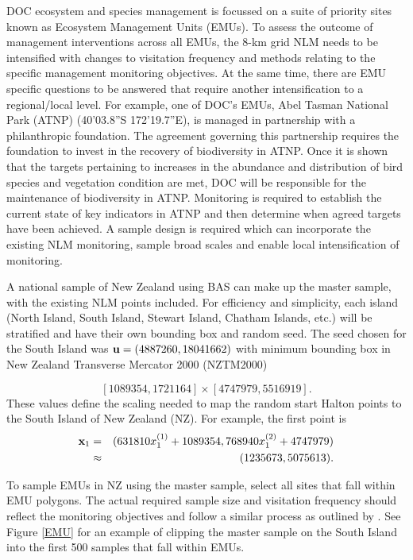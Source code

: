 \documentclass[titlepage]{article}
\begin{document}
DOC ecosystem and species management is focussed on a suite of priority sites known as Ecosystem Management Units (EMUs). To assess the outcome of management interventions across all EMUs, the 8-km grid NLM needs to be intensified with changes to visitation frequency and methods relating to the specific management monitoring objectives. At the same time, there are EMU specific questions to be answered that require another intensification to a regional/local level. For example, one of DOC's EMUs, Abel Tasman National Park (ATNP) (40'03.8''S 172'19.7''E), is managed in partnership with a philanthropic foundation. The agreement governing this partnership requires the foundation to invest in the recovery of biodiversity in ATNP. Once it is shown that the targets pertaining to increases in the abundance and distribution of bird species and vegetation condition are met, DOC will be responsible for the maintenance of biodiversity in ATNP. Monitoring is required to establish the current state of key indicators in ATNP and then determine when agreed targets have been achieved. A sample design is required which can incorporate the existing NLM monitoring, sample broad scales and enable local intensification of monitoring.

A national sample of New Zealand using BAS can make up the master sample, with the existing NLM points included. For efficiency and simplicity, each island (North Island, South Island, Stewart Island, Chatham Islands, etc.) will be stratified and have their own bounding box and random seed. The seed chosen for the South Island was ${\bf u} = (4887260, 18041662)$ with minimum bounding box in New Zealand Transverse Mercator 2000 (NZTM2000)

$$
[1089354, 1721164] \times [4747979, 5516919].
$$
These values define the scaling needed to map the random start Halton points to the South Island of New Zealand (NZ). For example, the first point is
\begin{eqnarray*}
	{\bf x}_1 & = & (631810 x_1^{(1)} + 1089354, 768940 x_1^{(2)} + 4747979)\\
	& \approx & (1235673, 5075613).
\end{eqnarray*}

To sample EMUs in NZ using the master sample, select all sites that fall within EMU polygons. The actual required sample size and visitation frequency should reflect the monitoring objectives and follow a similar process as outlined by \citep{Reynolds2016}. See Figure \ref{EMU} for an example of clipping the master sample on the South Island into the first 500 samples that fall within EMUs.
\end{document}
